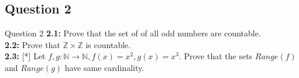 \documentclass[xcolor=svgnames]{beamer}
\begin{document}
\subsection{Question 2}

\begin{frame}{Question 2}
    \textbf{2.1:} Prove that the set of of all odd numbers are countable.
    \\ \textbf{2.2:} Prove that $\mathbb{Z} \times \mathbb{Z}$ is countable.
    \\ \textbf{2.3:} [*] Let $f,g:\mathbb{N} \rightarrow \mathbb{N},f(x)=x^2,g(x)=x^3$.  Prove that the sets $Range(f)$ and $Range(g)$ have same cardinality.
\end{frame}
\end{document}
